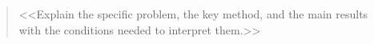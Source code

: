 \begin{abstract}
<<Explain the specific problem, the key method, and the main results with the
conditions needed to interpret them.>>
\end{abstract}

